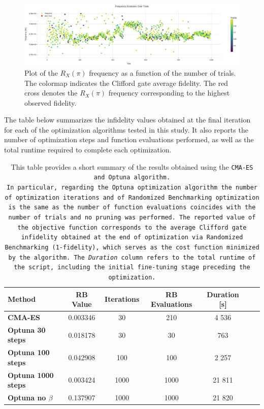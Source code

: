 \begin{figure}[h!]
    \centering
    \includegraphics[width=\textwidth]{figures/png/RB_optimization/Optuna/1000/frequency.png}
    \caption{Plot of the $R_X(\pi)$ frequency as a function of the number of trials. 
    The colormap indicates the Clifford gate average fidelity.  
    The red cross denotes the $R_X(\pi)$ frequency corresponding to the highest observed fidelity.}
    \label{fig:optuna1000:frequency}
\end{figure}

The table below summarizes the infidelity values obtained at the final iteration for each of the optimization algorithms tested in this study. 
It also reports the number of optimization steps and function evaluations performed, as well as the total runtime required to complete each optimization.

\begin{table}[h]
    \centering
    \begin{tabular}{lcccccc}
        \toprule
        \textbf{Method} & \textbf{RB Value} & \textbf{Iterations} & \textbf{RB Evaluations} & \textbf{Duration [s]}\\
        \midrule
        \textbf{CMA-ES} & 0.003346 & 30 & 210 & 4 536 \\
        \textbf{Optuna 30 steps} & 0.018178  & 30 & 30 & 763\\
        \textbf{Optuna 100 steps} & 0.042908 & 100 & 100 & 2 257\\
        \textbf{Optuna 1000 steps} & 0.003424 & 1000 & 1000 & 21 811\\
        \textbf{Optuna no $\beta$} & 0.137907 & 1000 & 1000 & 21 820\\
        \bottomrule
    \end{tabular}
    \caption{This table provides a short summary of the results obtained using the \tt{CMA-ES} and \tt{Optuna} algorithm.\\ 
    In particular, regarding the \tt{Optuna} optimization algorithm the number of optimization iterations and of Randomized Benchmarking optimization is the same as the number of function evaluations coincides with the number of trials and no pruning was performed.
    The reported value of the objective function corresponds to the average Clifford gate infidelity obtained at the end of optimization via Randomized Benchmarking (1-fidelity), which serves as the cost function minimized by the algorithm.
    The \textit{Duration} column refers to the total runtime of the script, including the initial fine-tuning stage preceding the optimization.\\}
    \label{tab:optuna_opt}
\end{table}

